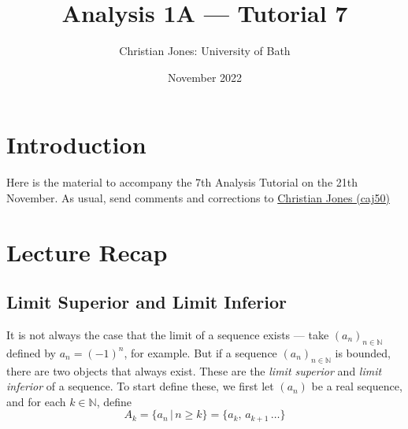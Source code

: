 \documentclass[
  12pt,
  a4paper]{extarticle}
\title{Analysis 1A --- Tutorial 7}
\author{Christian Jones: University of Bath}
\date{November 2022}
\theoremstyle{plain}
\theoremstyle{plain}
\theoremstyle{plain}
\theoremstyle{plain}
\theoremstyle{plain}
\theoremstyle{definition}
\theoremstyle{definition}
\theoremstyle{definition}
\theoremstyle{remark}
\renewcommand{\;}{\,}
\begin{document}
\maketitle

{
\setcounter{tocdepth}{2}
\tableofcontents
}
\newpage
{}

\hypertarget{introduction}{%
\section*{Introduction}\label{introduction}}

Here is the material to accompany the 7th Analysis Tutorial on the 21th November. As usual, send comments and corrections to \href{mailto:caj50@bath.ac.uk}{Christian Jones (caj50)}

\hypertarget{lecture-recap}{%
\section{Lecture Recap}\label{lecture-recap}}

\hypertarget{limit-superior-and-limit-inferior}{%
\subsection{Limit Superior and Limit Inferior}\label{limit-superior-and-limit-inferior}}

It is not always the case that the limit of a sequence exists --- take \((a_n)_{n\in\mathbb{N}}\) defined by \(a_n = (-1)^n\), for example. But if a sequence \((a_n)_{n\in\mathbb{N}}\) is bounded, there are two objects that always exist. These are the \emph{limit superior} and \emph{limit inferior} of a sequence. To start define these, we first let \((a_n)\) be a real sequence, and for each \(k \in \mathbb{N}\), define \[A_k = \lbrace a_n \,\lvert\, n \geq k\rbrace = \lbrace a_k,\,a_{k+1}\,\ldots\rbrace\]
\end{document}
